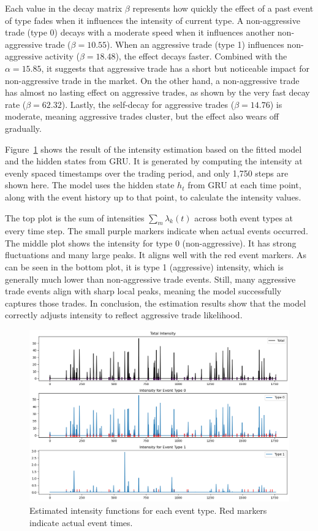 Each value in the decay matrix $\beta$ represents how quickly the effect of a past event of type fades when it influences the intensity of current type. A non-aggressive trade (type 0) decays with a moderate speed when it influences another non-aggressive trade (\( \beta = 10.55 \)). When an aggressive trade (type 1) influences non-aggressive activity (\( \beta = 18.48 \)), the effect decays faster. Combined with the $\alpha = 15.85$, it suggests that aggressive trade has a short but noticeable impact for non-aggressive trade in the market. On the other hand, a non-aggressive trade has almost no lasting effect on aggressive trades, as shown by the very fast decay rate (\( \beta = 62.32 \)). Lastly, the self-decay for aggressive trades (\( \beta = 14.76 \)) is moderate, meaning aggressive trades cluster, but the effect also wears off gradually.


Figure~\ref{fig:neuralhp-intensity} shows the result of the intensity estimation based on the fitted model and the hidden states from GRU. It is generated by computing the intensity at evenly spaced timestamps over the trading period, and only 1,750 steps are shown here. The model uses the hidden state $h_t$ from GRU at each time point, along with the event history up to that point, to calculate the intensity values. 

The top plot is the sum of intensities $\sum_{m} \lambda_k(t)$ across both event types at every time step. The small purple markers indicate when actual events occurred. The middle plot shows the intensity for type 0 (non-aggressive). It has strong fluctuations and many large peaks. It aligns well with the red event markers. As can be seen in the bottom plot, it is type 1 (aggressive) intensity, which is generally much lower than non-aggressive trade events. Still, many aggressive trade events align with sharp local peaks, meaning the model successfully captures those trades. In conclusion, the estimation results show that the model correctly adjusts intensity to reflect aggressive trade likelihood.

\begin{figure}[H]
    \centering
    \includegraphics[width=0.95\linewidth]{figures/hp_estimation.png}
    \caption{Estimated intensity functions for each event type. Red markers indicate actual event times.}
    \label{fig:neuralhp-intensity}
\end{figure}

